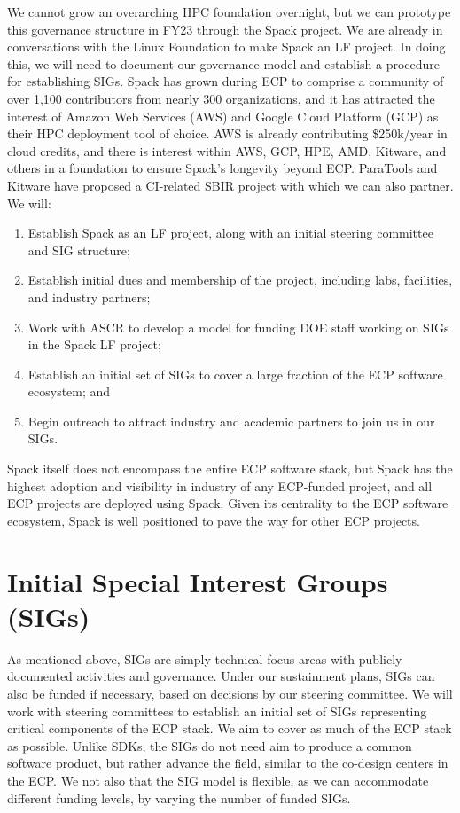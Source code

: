 \documentclass[11pt]{article}
\begin{document}
We cannot grow an overarching HPC foundation overnight, but we can prototype this
governance structure in FY23 through the Spack project. We are already in conversations
with the Linux Foundation to make Spack an LF project. In doing this, we will need to
document our governance model and establish a procedure for establishing SIGs. Spack has
grown during ECP to comprise a community of over 1,100 contributors from nearly 300
organizations, and it has attracted the interest of Amazon Web Services (AWS) and Google
Cloud Platform (GCP) as their HPC deployment tool of choice. AWS is already contributing
\$250k/year in cloud credits, and there is interest within AWS, GCP, HPE, AMD, Kitware,
and others in a foundation to ensure Spack's longevity beyond ECP. ParaTools and Kitware
have proposed a CI-related SBIR project with which we can also partner. We will:

\begin{enumerate}
\item Establish Spack as an LF project, along with an initial steering committee and SIG
  structure;
\item Establish initial dues and membership of the project, including labs, facilities,
  and industry partners;
\item Work with ASCR to develop a model for funding DOE staff working on SIGs in the
  Spack LF project;
\item Establish an initial set of SIGs to cover a large fraction of the ECP software
  ecosystem; and
\item Begin outreach to attract industry and academic partners to join us in our SIGs.
\end{enumerate}

Spack itself does not encompass the entire ECP software stack, but Spack has the highest
adoption and visibility in industry of any ECP-funded project, and all ECP projects are
deployed using Spack. Given its centrality to the ECP software ecosystem, Spack is well
positioned to pave the way for other ECP projects.

\section{Initial Special Interest Groups (SIGs)}

As mentioned above, SIGs are simply technical focus areas with publicly documented
activities and governance. Under our sustainment plans, SIGs can also be funded if
necessary, based on decisions by our steering committee. We will work with steering
committees to establish an initial set of SIGs representing critical components of the
ECP stack. We aim to cover as much of the ECP stack as possible. Unlike SDKs, the SIGs
do not need aim to produce a common software product, but rather advance the field,
similar to the co-design centers in the ECP. We not also that the SIG model is flexible,
as we can accommodate different funding levels, by varying the number of funded SIGs.
\end{document}
